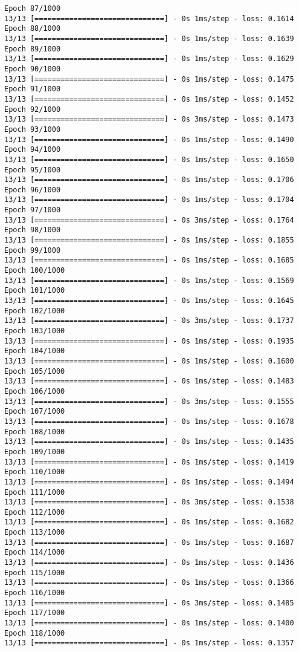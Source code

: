 \documentclass[11pt]{article}
\begin{document}
\begin{Verbatim}[commandchars=\\\{\}]
Epoch 87/1000
13/13 [==============================] - 0s 1ms/step - loss: 0.1614
Epoch 88/1000
13/13 [==============================] - 0s 1ms/step - loss: 0.1639
Epoch 89/1000
13/13 [==============================] - 0s 1ms/step - loss: 0.1629
Epoch 90/1000
13/13 [==============================] - 0s 1ms/step - loss: 0.1475
Epoch 91/1000
13/13 [==============================] - 0s 1ms/step - loss: 0.1452
Epoch 92/1000
13/13 [==============================] - 0s 3ms/step - loss: 0.1473
Epoch 93/1000
13/13 [==============================] - 0s 1ms/step - loss: 0.1490
Epoch 94/1000
13/13 [==============================] - 0s 1ms/step - loss: 0.1650
Epoch 95/1000
13/13 [==============================] - 0s 1ms/step - loss: 0.1706
Epoch 96/1000
13/13 [==============================] - 0s 1ms/step - loss: 0.1704
Epoch 97/1000
13/13 [==============================] - 0s 3ms/step - loss: 0.1764
Epoch 98/1000
13/13 [==============================] - 0s 1ms/step - loss: 0.1855
Epoch 99/1000
13/13 [==============================] - 0s 1ms/step - loss: 0.1685
Epoch 100/1000
13/13 [==============================] - 0s 1ms/step - loss: 0.1569
Epoch 101/1000
13/13 [==============================] - 0s 1ms/step - loss: 0.1645
Epoch 102/1000
13/13 [==============================] - 0s 3ms/step - loss: 0.1737
Epoch 103/1000
13/13 [==============================] - 0s 1ms/step - loss: 0.1935
Epoch 104/1000
13/13 [==============================] - 0s 1ms/step - loss: 0.1600
Epoch 105/1000
13/13 [==============================] - 0s 1ms/step - loss: 0.1483
Epoch 106/1000
13/13 [==============================] - 0s 3ms/step - loss: 0.1555
Epoch 107/1000
13/13 [==============================] - 0s 1ms/step - loss: 0.1678
Epoch 108/1000
13/13 [==============================] - 0s 1ms/step - loss: 0.1435
Epoch 109/1000
13/13 [==============================] - 0s 1ms/step - loss: 0.1419
Epoch 110/1000
13/13 [==============================] - 0s 1ms/step - loss: 0.1494
Epoch 111/1000
13/13 [==============================] - 0s 3ms/step - loss: 0.1538
Epoch 112/1000
13/13 [==============================] - 0s 1ms/step - loss: 0.1682
Epoch 113/1000
13/13 [==============================] - 0s 1ms/step - loss: 0.1687
Epoch 114/1000
13/13 [==============================] - 0s 1ms/step - loss: 0.1436
Epoch 115/1000
13/13 [==============================] - 0s 1ms/step - loss: 0.1366
Epoch 116/1000
13/13 [==============================] - 0s 3ms/step - loss: 0.1485
Epoch 117/1000
13/13 [==============================] - 0s 1ms/step - loss: 0.1400
Epoch 118/1000
13/13 [==============================] - 0s 1ms/step - loss: 0.1357

\end{Verbatim}
\end{document}
